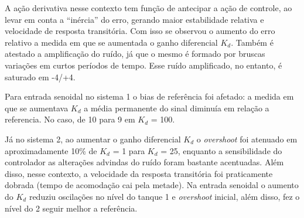 
A ação derivativa nesse contexto tem função de antecipar a ação de controle, ao levar em conta a “inércia” do erro, gerando maior estabilidade relativa e velocidade de resposta transitória. Com isso se observou o aumento do erro relativo a medida em que se aumentada o ganho diferencial $K_d$. Também é atestado a amplificação do ruído, já que o mesmo é formado por bruscas variações em curtos períodos de tempo. Esse ruído amplificado, no entanto, é saturado em -4/+4. 

Para entrada senoidal no sistema 1 o bias de referência foi afetado: a medida em que se aumentava $K_d$ a média permanente do sinal diminuía em relação a referencia. No caso, de 10 para 9 em $K_d$ = 100.

Já no sistema 2, ao aumentar o ganho diferencial $K_d$ o \emph{overshoot} foi atenuado em aproximadamente 10\% de $K_d$ = 1 para $K_d$ = 25, enquanto a sensibilidade do controlador as alterações advindas do ruído foram bastante acentuadas. Além disso, nesse contexto, a velocidade da resposta transitória foi praticamente dobrada (tempo de acomodação cai pela metade). Na entrada senoidal o aumento do $K_d$ reduziu oscilações no nível do tanque 1 e \emph{overshoot} inicial, além disso, fez o nível do 2 seguir melhor a referência.

